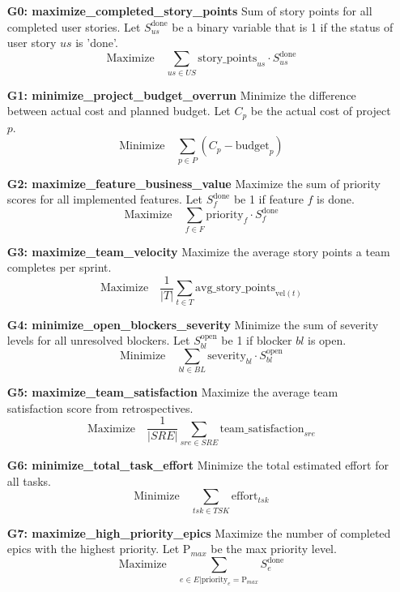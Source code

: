 \documentclass[11pt]{article}
\begin{document}
\begin{itemize}
    \item[\textbf{G0: maximize\_completed\_story\_points}] Sum of story points for all completed user stories. Let $S_{us}^{\text{done}}$ be a binary variable that is 1 if the status of user story $us$ is 'done'.
    $$ \text{Maximize} \quad \sum_{us \in US} \text{story\_points}_{us} \cdot S_{us}^{\text{done}} $$

    \item[\textbf{G1: minimize\_project\_budget\_overrun}] Minimize the difference between actual cost and planned budget. Let $C_p$ be the actual cost of project $p$.
    $$ \text{Minimize} \quad \sum_{p \in P} (C_p - \text{budget}_p) $$

    \item[\textbf{G2: maximize\_feature\_business\_value}] Maximize the sum of priority scores for all implemented features. Let $S_{f}^{\text{done}}$ be 1 if feature $f$ is done.
    $$ \text{Maximize} \quad \sum_{f \in F} \text{priority}_{f} \cdot S_{f}^{\text{done}} $$

    \item[\textbf{G3: maximize\_team\_velocity}] Maximize the average story points a team completes per sprint.
    $$ \text{Maximize} \quad \frac{1}{|T|} \sum_{t \in T} \text{avg\_story\_points}_{\text{vel}(t)} $$

    \item[\textbf{G4: minimize\_open\_blockers\_severity}] Minimize the sum of severity levels for all unresolved blockers. Let $S_{bl}^{\text{open}}$ be 1 if blocker $bl$ is open.
    $$ \text{Minimize} \quad \sum_{bl \in BL} \text{severity}_{bl} \cdot S_{bl}^{\text{open}} $$

    \item[\textbf{G5: maximize\_team\_satisfaction}] Maximize the average team satisfaction score from retrospectives.
    $$ \text{Maximize} \quad \frac{1}{|SRE|} \sum_{sre \in SRE} \text{team\_satisfaction}_{sre} $$

    \item[\textbf{G6: minimize\_total\_task\_effort}] Minimize the total estimated effort for all tasks.
    $$ \text{Minimize} \quad \sum_{tsk \in TSK} \text{effort}_{tsk} $$

    \item[\textbf{G7: maximize\_high\_priority\_epics}] Maximize the number of completed epics with the highest priority. Let $\text{P}_{max}$ be the max priority level.
    $$ \text{Maximize} \quad \sum_{e \in E | \text{priority}_e = \text{P}_{max}} S_{e}^{\text{done}} $$


\end{itemize}
\end{document}
